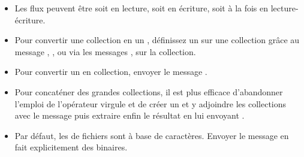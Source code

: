 \documentclass[a4paper,10pt,twoside]{book}
\begin{document}
\begin{itemize}
  \item Les flux peuvent être soit en lecture, soit en écriture, soit à la fois en lecture-écriture.
  \item Pour convertir une collection en un \stream, définissez un \stream
sur une collection grâce au message , \eg {}, ou via les messages , \etc sur la collection.
  \item Pour convertir un \stream en collection, envoyer le message .
  \item Pour concaténer des grandes collections, il est plus efficace d'abandonner l'emploi de l'opérateur virgule \ct{,} et de créer un \stream et y adjoindre les collections avec le message  puis extraire enfin le résultat en lui envoyant .
  \item Par défaut, les \streams de fichiers sont à base de caractères.
Envoyer le message  en fait explicitement des \streams binaires.
\end{itemize}

\ifx\wholebook\relax\else
\end{document}
